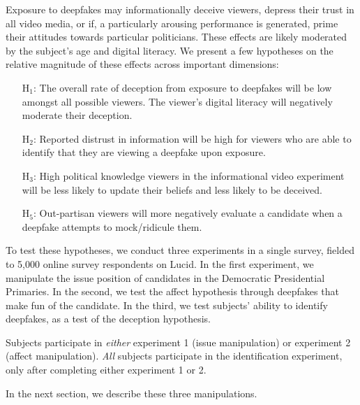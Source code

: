 Exposure to deepfakes may informationally deceive viewers, depress
their trust in all video media, or if, a particularly arousing
performance is generated, prime their attitudes towards particular
politicians. These effects are likely moderated by the subject's age
and digital literacy. We present a few hypotheses on the relative
magnitude of these effects across important dimensions:

\begin{itemize}

\item[H$_1$:] The overall rate of deception from exposure to deepfakes
  will be low amongst all possible viewers. The viewer's digital
  literacy will negatively moderate their deception.

\item[H$_2$:] Reported distrust in information will be high for viewers
  who are able to identify that they are viewing a deepfake upon
  exposure.

\item[H$_3$:] High political knowledge viewers in the informational
  video experiment will be less likely to update their beliefs and
  less likely to be deceived.

\item[H$_5$:] Out-partisan viewers will more negatively evaluate a
  candidate when a deepfake attempts to mock/ridicule them.
\end{itemize}

To test these hypotheses, we conduct three experiments in a single
survey, fielded to 5,000 online survey respondents on Lucid. In the
first experiment, we manipulate the issue position of candidates in
the Democratic Presidential Primaries. In the second, we test the
affect hypothesis through deepfakes that make fun of the candidate. In
the third, we test subjects' ability to identify deepfakes, as a test
of the deception hypothesis.

Subjects participate in \emph{either} experiment 1 (issue
manipulation) or experiment 2 (affect manipulation). \emph{All}
subjects participate in the identification experiment, only after
completing either experiment 1 or 2.

In the next section, we describe these three manipulations.

